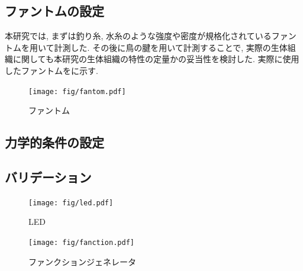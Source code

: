 \subsection{ファントムの設定}
本研究では, まずは釣り糸, 水糸のような強度や密度が規格化されているファントムを用いて計測した. その後に鳥の腱を用いて計測することで, 実際の生体組織に関しても本研究の生体組織の特性の定量かの妥当性を検討した. 実際に使用したファントムをに示す.
\begin{figure}[H]
  \begin{center}
    \texttt{[image: fig/fantom.pdf]}
  \end{center}
  \caption{ファントム}
\end{figure}
\subsection{力学的条件の設定}
\subsection{バリデーション}
\begin{figure}[H]
 \begin{minipage}{0.5\hsize}
  \begin{center}
   \texttt{[image: fig/led.pdf]}
  \end{center}
  \caption{LED}
 \end{minipage}
 \begin{minipage}{0.5\hsize}
 \begin{center}
  \texttt{[image: fig/fanction.pdf]}
 \end{center}
  \caption{ファンクションジェネレータ }
 \end{minipage}
\end{figure}
